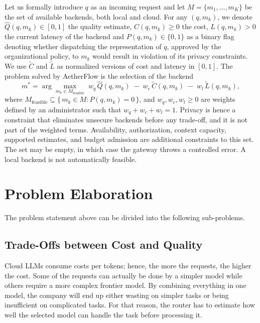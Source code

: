 \documentclass{FastFyp}
\begin{document}
Let us formally introduce $q$ as an incoming request and let $M=\{m_1,\ldots, m_K\}$ be the set of available backends, both local and cloud. For any $(q,m_k)$, we denote $\hat{Q}(q,m_k)\in [0,1]$ the quality estimate, $C(q, m_k)\geq 0$ the cost, $L(q, m_k)>0$ the current latency of the backend and $P(q, m_k)\in\{0,1\}$ as a binary flag denoting whether dispatching the representation of $q$, approved by the organizational policy, to $m_k$ would result in violation of its privacy constraints. We use $\tilde{C}$ and $\tilde{L}$ as normalized versions of cost and latency in $[0,1]$. The problem solved by AetherFlow is the selection of the backend
\begin{equation}
m^{*} = \arg\max_{m_k \in M_{\mathrm{feasible}}} \; w_q\,\hat{Q}(q, m_k) \; - \; w_c\,\tilde{C}(q, m_k) \; - \; w_l\,\tilde{L}(q,m_k),
\label{eq:objective}
\end{equation}
where $M_{\mathrm{feasible}}\subseteq\{\,m_k\in M:P(q,m_k)=0\,\}$, and $w_q, w_c, w_l\geq 0$ are weights defined by an administrator such that $w_q + w_c + w_l = 1$. Privacy is hence a constraint that eliminates unsecure backends before any trade-off, and it is not part of the weighted terms. Availability, authorization, context capacity, supported estimates, and budget admission are additional constraints to this set. The set may be empty, in which case the gateway throws a controlled error. A local backend is not automatically feasible.

\section{Problem Elaboration}
\label{sec:elaboration}

The problem statement above can be divided into the following sub-problems.

\subsection{Trade-Offs between Cost and Quality}
Cloud LLMs consume costs per tokens; hence, the more the requests, the higher the cost. Some of the requests can actually be done by a simpler model while others require a more complex frontier model. By combining everything in one model, the company will end up either wasting on simpler tasks or being insufficient on complicated tasks. For that reason, the router has to estimate how well the selected model can handle the task before processing it.
\end{document}
